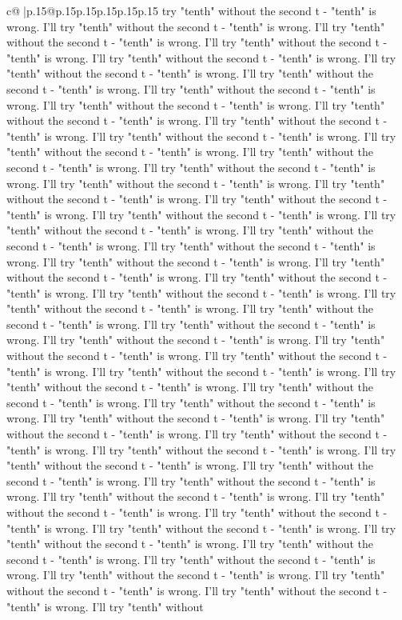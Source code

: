 \documentclass{article}
\begin{document}
{\begin{supertabular}{c@{$\;$}|p{.15\linewidth}@{}p{.15\linewidth}p{.15\linewidth}p{.15\linewidth}p{.15\linewidth}p{.15\linewidth}}
{{{try "tenth" without the second t {-} "tenth" is wrong. I'll try "tenth" without the second t {-} "tenth" is wrong. I'll try "tenth" without the second t {-} "tenth" is wrong. I'll try "tenth" without the second t {-} "tenth" is wrong. I'll try "tenth" without the second t {-} "tenth" is wrong. I'll try "tenth" without the second t {-} "tenth" is wrong. I'll try "tenth" without the second t {-} "tenth" is wrong. I'll try "tenth" without the second t {-} "tenth" is wrong. I'll try "tenth" without the second t {-} "tenth" is wrong. I'll try "tenth" without the second t {-} "tenth" is wrong. I'll try "tenth" without the second t {-} "tenth" is wrong. I'll try "tenth" without the second t {-} "tenth" is wrong. I'll try "tenth" without the second t {-} "tenth" is wrong. I'll try "tenth" without the second t {-} "tenth" is wrong. I'll try "tenth" without the second t {-} "tenth" is wrong. I'll try "tenth" without the second t {-} "tenth" is wrong. I'll try "tenth" without the second t {-} "tenth" is wrong. I'll try "tenth" without the second t {-} "tenth" is wrong. I'll try "tenth" without the second t {-} "tenth" is wrong. I'll try "tenth" without the second t {-} "tenth" is wrong. I'll try "tenth" without the second t {-} "tenth" is wrong. I'll try "tenth" without the second t {-} "tenth" is wrong. I'll try "tenth" without the second t {-} "tenth" is wrong. I'll try "tenth" without the second t {-} "tenth" is wrong. I'll try "tenth" without the second t {-} "tenth" is wrong. I'll try "tenth" without the second t {-} "tenth" is wrong. I'll try "tenth" without the second t {-} "tenth" is wrong. I'll try "tenth" without the second t {-} "tenth" is wrong. I'll try "tenth" without the second t {-} "tenth" is wrong. I'll try "tenth" without the second t {-} "tenth" is wrong. I'll try "tenth" without the second t {-} "tenth" is wrong. I'll try "tenth" without the second t {-} "tenth" is wrong. I'll try "tenth" without the second t {-} "tenth" is wrong. I'll try "tenth" without the second t {-} "tenth" is wrong. I'll try "tenth" without the second t {-} "tenth" is wrong. I'll try "tenth" without the second t {-} "tenth" is wrong. I'll try "tenth" without the second t {-} "tenth" is wrong. I'll try "tenth" without the second t {-} "tenth" is wrong. I'll try "tenth" without the second t {-} "tenth" is wrong. I'll try "tenth" without the second t {-} "tenth" is wrong. I'll try "tenth" without the second t {-} "tenth" is wrong. I'll try "tenth" without the second t {-} "tenth" is wrong. I'll try "tenth" without the second t {-} "tenth" is wrong. I'll try "tenth" without the second t {-} "tenth" is wrong. I'll try "tenth" without the second t {-} "tenth" is wrong. I'll try "tenth" without the second t {-} "tenth" is wrong. I'll try "tenth" without the second t {-} "tenth" is wrong. I'll try "tenth" without the second t {-} "tenth" is wrong. I'll try "tenth" without the second t {-} "tenth" is wrong. I'll try "tenth" without the second t {-} "tenth" is wrong. I'll try "tenth" without the second t {-} "tenth" is wrong. I'll try "tenth" without the second t {-} "tenth" is wrong. I'll try "tenth" without the second t {-} "tenth" is wrong. I'll try "tenth" without }}}
\end{supertabular}}
\end{document}
